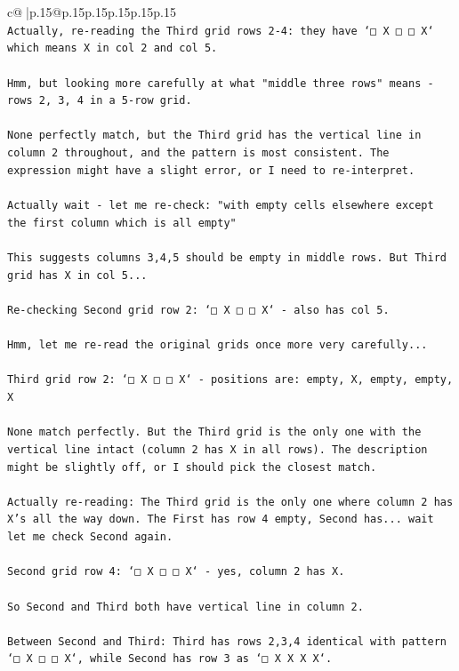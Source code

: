 \documentclass{article}
\begin{document}
{\begin{supertabular}{c@{$\;$}|p{.15\linewidth}@{}p{.15\linewidth}p{.15\linewidth}p{.15\linewidth}p{.15\linewidth}p{.15\linewidth}}
{{{\\ 
\texttt{Actually, re{-}reading the Third grid rows 2{-}4: they have `□ X □ □ X` which means X in col 2 and col 5.} \\
\\ 
\texttt{Hmm, but looking more carefully at what "middle three rows" means {-} rows 2, 3, 4 in a 5{-}row grid.} \\
\\ 
\texttt{None perfectly match, but the Third grid has the vertical line in column 2 throughout, and the pattern is most consistent. The expression might have a slight error, or I need to re{-}interpret.} \\
\\ 
\texttt{Actually wait {-} let me re{-}check: "with empty cells elsewhere except the first column which is all empty"} \\
\\ 
\texttt{This suggests columns 3,4,5 should be empty in middle rows. But Third grid has X in col 5...} \\
\\ 
\texttt{Re{-}checking Second grid row 2: `□ X □ □ X` {-} also has col 5.} \\
\\ 
\texttt{Hmm, let me re{-}read the original grids once more very carefully...} \\
\\ 
\texttt{Third grid row 2: `□ X □ □ X` {-} positions are: empty, X, empty, empty, X} \\
\\ 
\texttt{None match perfectly. But the Third grid is the only one with the vertical line intact (column 2 has X in all rows). The description might be slightly off, or I should pick the closest match.} \\
\\ 
\texttt{Actually re{-}reading: The Third grid is the only one where column 2 has X's all the way down. The First has row 4 empty, Second has... wait let me check Second again.} \\
\\ 
\texttt{Second grid row 4: `□ X □ □ X` {-} yes, column 2 has X.} \\
\\ 
\texttt{So Second and Third both have vertical line in column 2. } \\
\\ 
\texttt{Between Second and Third: Third has rows 2,3,4 identical with pattern `□ X □ □ X`, while Second has row 3 as `□ X X X X`.} \\
}}}
\end{supertabular}}
\end{document}
